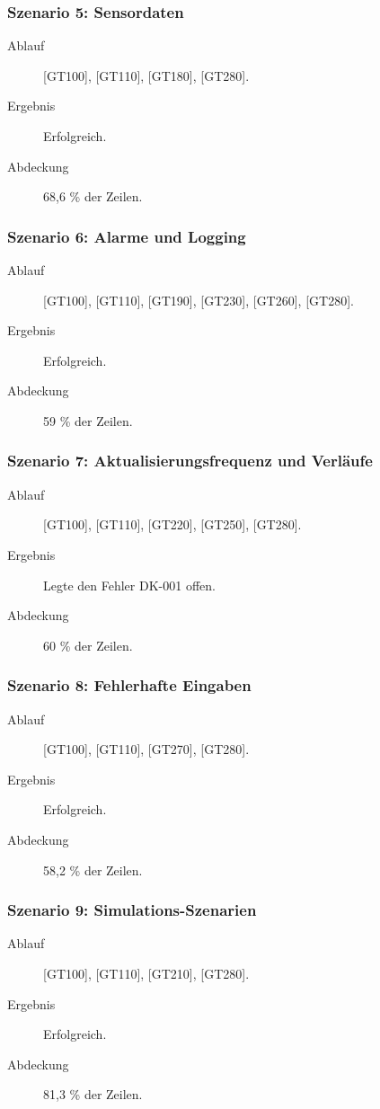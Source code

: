 \documentclass[parskip=full]{scrartcl}
\begin{document}
\subsubsection{Szenario 5: Sensordaten}
\begin{description}
	\item[Ablauf] [GT100], [GT110], [GT180], [GT280].
	\item[Ergebnis] Erfolgreich.
	\item[Abdeckung] 68,6 \% der Zeilen.
\end{description}

\subsubsection{Szenario 6: Alarme und Logging}
\begin{description}
	\item[Ablauf] [GT100], [GT110], [GT190], [GT230], [GT260], [GT280].
	\item[Ergebnis] Erfolgreich.
	\item[Abdeckung] 59 \% der Zeilen.
\end{description}

\subsubsection{Szenario 7: Aktualisierungsfrequenz und Verläufe}
\begin{description}
	\item[Ablauf] [GT100], [GT110], [GT220], [GT250], [GT280].
	\item[Ergebnis] Legte den Fehler DK-001 offen.
	\item[Abdeckung] 60 \% der Zeilen.
\end{description}

\subsubsection{Szenario 8: Fehlerhafte Eingaben}
\begin{description}
	\item[Ablauf] [GT100], [GT110], [GT270], [GT280].
	\item[Ergebnis] Erfolgreich.
	\item[Abdeckung] 58,2 \% der Zeilen.
\end{description}

\subsubsection{Szenario 9: Simulations-Szenarien}
\begin{description}
	\item[Ablauf] [GT100], [GT110], [GT210], [GT280].
	\item[Ergebnis] Erfolgreich.
	\item[Abdeckung] 81,3 \% der Zeilen.
\end{description}
\end{document}

